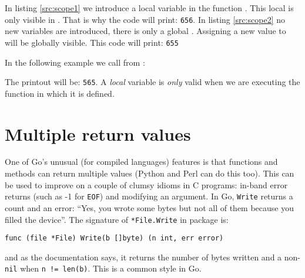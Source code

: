 \begin{minipage}{.5\textwidth}

\hfill
\vfill
\end{minipage}
\hfill
\begin{minipage}{.5\textwidth}

\hfill
\vfill
\end{minipage}

In listing \ref{src:scope1} we introduce a local variable 
in the function .
This local  is only visible in . That is
why the code will print: \texttt{656}.
In listing \ref{src:scope2} no new variables are introduced, there
is only a global .
Assigning a new value to  will be globally visible. This code will
print: \texttt{655}

In the following example we call  from :



The printout will be: \texttt{565}. A \emph{local} variable is \emph{only}
valid when we are executing the function in which it is defined. 

\section{Multiple return values}
\label{sec:multiple return}
One of Go's unusual (for compiled languages) features is that functions and methods can return multiple
values (Python and Perl can do this too). This can be used to improve on a couple of 
clumsy idioms in C programs:
in-band error returns (such as -1 for \texttt{EOF}) and modifying an argument.
In Go, \lstinline{Write} returns a count and an
error: ``Yes, you wrote some bytes but not all of them because you filled the
device''. The signature of \lstinline{*File.Write} in package
 is:
\begin{lstlisting}
func (file *File) Write(b []byte) (n int, err error)
\end{lstlisting}
and as the documentation says, it returns the number of bytes written and a
non-\lstinline{nil}  when \lstinline{n != len(b)}. This is a common
style in Go.

